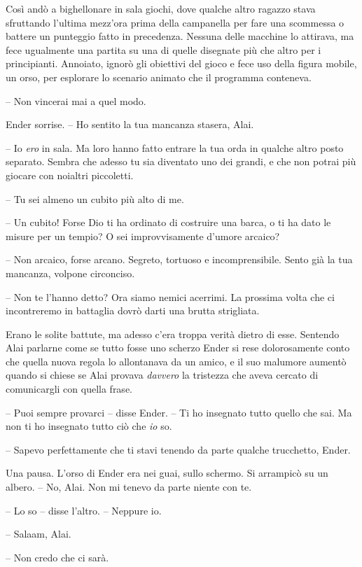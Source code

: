 {Così andò a bighellonare in sala giochi, dove qualche altro ragazzo
	stava sfruttando l'ultima mezz'ora prima della campanella per fare una
	scommessa o battere un punteggio fatto in precedenza. Nessuna delle
	macchine lo attirava, ma fece ugualmente una partita su una di quelle
	disegnate più che altro per i principianti. Annoiato, ignorò gli
	obiettivi del gioco e fece uso della figura mobile, un orso, per
	esplorare lo scenario animato che il programma conteneva.}

{-- Non vincerai mai a quel modo.}

{Ender sorrise. -- Ho sentito la tua mancanza stasera, Alai.}

{-- Io \emph{ero} in sala. Ma loro hanno fatto entrare la tua orda in
	qualche altro posto separato. Sembra che adesso tu sia diventato uno dei
	grandi, e che non potrai più giocare con noialtri piccoletti.}

{-- Tu sei almeno un cubito più alto di me.}

{-- Un cubito! Forse Dio ti ha ordinato di costruire una barca, o ti ha
	dato le misure per un tempio? O sei improvvisamente d'umore arcaico?}

{-- Non arcaico, forse arcano. Segreto, tortuoso e incomprensibile.
	Sento già la tua mancanza, volpone circonciso.}

{-- Non te l'hanno detto? Ora siamo nemici acerrimi. La prossima volta
	che ci incontreremo in battaglia dovrò darti una brutta strigliata.}

{Erano le solite battute, ma adesso c'era troppa verità dietro di esse.
	Sentendo Alai parlarne come se tutto fosse uno scherzo Ender si rese
	dolorosamente conto che quella nuova regola lo allontanava da un amico,
	e il suo malumore aumentò quando si chiese se Alai provava
	\emph{davvero} la tristezza che aveva cercato di comunicargli con quella
	frase.}

{-- Puoi sempre provarci -- disse Ender. -- Ti ho insegnato tutto quello
	che sai. Ma non ti ho insegnato tutto ciò che \emph{io} so.}

{-- Sapevo perfettamente che ti stavi tenendo da parte qualche
	trucchetto, Ender.}

{Una pausa. L'orso di Ender era nei guai, sullo schermo. Si arrampicò su
	un albero. -- No, Alai. Non mi tenevo da parte niente con te.}

{-- Lo so -- disse l'altro. -- Neppure io.}

{-- Salaam, Alai.}

{-- Non credo che ci sarà.}

